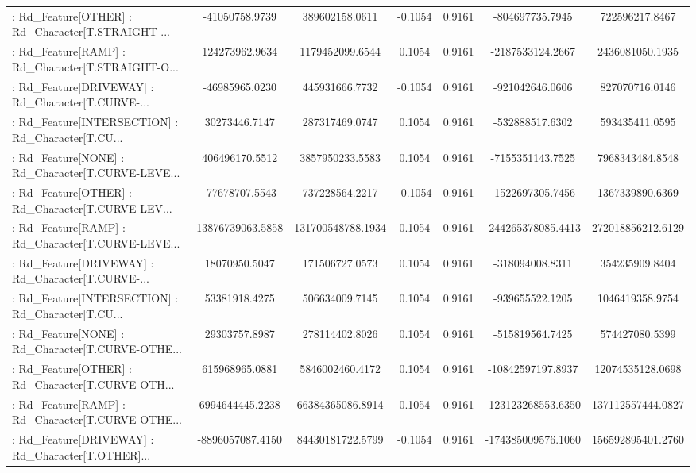 \begin{longtable}{p{4cm}cccccc}
 : Rd\_Feature[OTHER] : Rd\_Character[T.STRAIGHT-... &    -41050758.9739 &    389602158.0611 & -0.1054 &       0.9161 &    -804697735.7945 &    722596217.8467 \\
 : Rd\_Feature[RAMP] : Rd\_Character[T.STRAIGHT-O... &    124273962.9634 &   1179452099.6544 &  0.1054 &       0.9161 &   -2187533124.2667 &   2436081050.1935 \\
 : Rd\_Feature[DRIVEWAY] : Rd\_Character[T.CURVE-... &    -46985965.0230 &    445931666.7732 & -0.1054 &       0.9161 &    -921042646.0606 &    827070716.0146 \\
 : Rd\_Feature[INTERSECTION] : Rd\_Character[T.CU... &     30273446.7147 &    287317469.0747 &  0.1054 &       0.9161 &    -532888517.6302 &    593435411.0595 \\
 : Rd\_Feature[NONE] : Rd\_Character[T.CURVE-LEVE... &    406496170.5512 &   3857950233.5583 &  0.1054 &       0.9161 &   -7155351143.7525 &   7968343484.8548 \\
 : Rd\_Feature[OTHER] : Rd\_Character[T.CURVE-LEV... &    -77678707.5543 &    737228564.2217 & -0.1054 &       0.9161 &   -1522697305.7456 &   1367339890.6369 \\
 : Rd\_Feature[RAMP] : Rd\_Character[T.CURVE-LEVE... &  13876739063.5858 & 131700548788.1934 &  0.1054 &       0.9161 & -244265378085.4413 & 272018856212.6129 \\
 : Rd\_Feature[DRIVEWAY] : Rd\_Character[T.CURVE-... &     18070950.5047 &    171506727.0573 &  0.1054 &       0.9161 &    -318094008.8311 &    354235909.8404 \\
 : Rd\_Feature[INTERSECTION] : Rd\_Character[T.CU... &     53381918.4275 &    506634009.7145 &  0.1054 &       0.9161 &    -939655522.1205 &   1046419358.9754 \\
 : Rd\_Feature[NONE] : Rd\_Character[T.CURVE-OTHE... &     29303757.8987 &    278114402.8026 &  0.1054 &       0.9161 &    -515819564.7425 &    574427080.5399 \\
 : Rd\_Feature[OTHER] : Rd\_Character[T.CURVE-OTH... &    615968965.0881 &   5846002460.4172 &  0.1054 &       0.9161 &  -10842597197.8937 &  12074535128.0698 \\
 : Rd\_Feature[RAMP] : Rd\_Character[T.CURVE-OTHE... &   6994644445.2238 &  66384365086.8914 &  0.1054 &       0.9161 & -123123268553.6350 & 137112557444.0827 \\
 : Rd\_Feature[DRIVEWAY] : Rd\_Character[T.OTHER]... &  -8896057087.4150 &  84430181722.5799 & -0.1054 &       0.9161 & -174385009576.1060 & 156592895401.2760 \\

\end{longtable}
